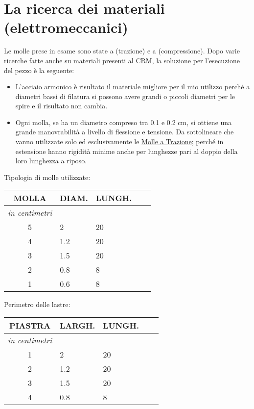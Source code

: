
\chapter{La ricerca dei materiali (elettromeccanici)}
\label{chp:La ricerca dei materiali (elettromeccanici)}

Le molle prese in esame sono state a (trazione) e a (compressione).
Dopo varie ricerche fatte anche su materiali presenti al CRM, la soluzione per l'esecuzione del pezzo è la seguente:

\begin{itemize}
\item{L'acciaio armonico è risultato il materiale migliore per il mio utilizzo perché a diametri bassi di filatura si possono avere grandi o piccoli diametri per le spire e il risultato non cambia.}
\item{Ogni molla, se ha un diametro compreso tra 0.1 e 0.2 cm, si ottiene una grande manovrabilità a livello di flessione e tensione. Da sottolineare che vanno utilizzate solo ed esclusivamente le \underline {Molle a Trazione}; perché in estensione hanno rigidità minime anche per lunghezze pari al doppio della loro lunghezza a riposo.}
\end{itemize}

Tipologia di molle utilizzate:

\begin{tabular}{cp{2cm}p{2cm}p{.2cm}p{2cm}} \textbf{MOLLA}&\textbf{DIAM.}&\textbf{LUNGH.}\\
\hline \textit{in centimetri} \\
\hline 5&2&20\\
\hline 4&1.2&20\\
\hline 3&1.5&20\\
\hline 2&0.8&8\\
\hline 1&0.6&8\\
\end{tabular}

Perimetro delle lastre:

\begin{tabular}{cp{2cm}p{2cm}p{.2cm}p{2cm}} \textbf{PIASTRA}&\textbf{LARGH.}&\textbf{LUNGH.}\\
\hline \textit{in centimetri} \\
\hline 1&2&20\\
\hline 2&1.2&20\\
\hline 3&1.5&20\\
\hline 4&0.8&8\\
\end{tabular}

